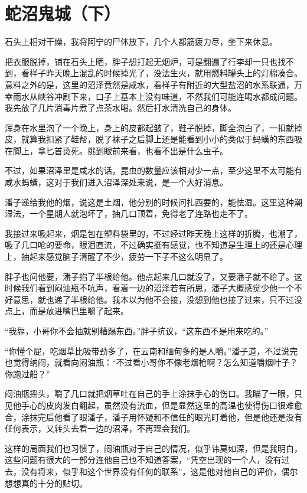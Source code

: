 \chapter{蛇沼鬼城（下）}

石头上相对干燥，我将阿宁的尸体放下，几个人都筋疲力尽，坐下来休息。

把衣服脱掉，铺在石头上晒，胖子想打起无烟炉，可是翻遍了行李却一只也找不到，看样子昨天晚上混乱的时候掉光了，没法生火，就用燃料罐头上的灯棉凑合。意料之外的是，这里的沼泽竟然是咸水，看样子有附近的大型盐沼的水系联通，万幸雨水从峡谷冲刷下来，口子上基本上没有味道，不然我们可能连喝水都成问题。我先放了几片消毒片煮了点茶水喝。然后打水清洗自己的身体。

浑身在水里泡了一个晚上，身上的皮都起皱了，鞋子脱掉，脚全泡白了，一扣就掉皮，就算我扣紧了鞋帮，脱了袜子之后脚上还是能看到小小的类似于蚂蟥的东西吸在脚上，拿匕首烫死。挑到眼前来看，也看不出是什么虫子。

不过，如果沼泽里是咸水的话，昆虫的数量应该相对少一点，至少这里不太可能有咸水蚂蟥，这对于我们进入沼泽深处来说，是一个大好消息。

潘子递给我他的烟，说这是土烟，他分别的时候问扎西要的，能怯湿。这里这种潮湿法，一个星期人就泡坏了，抽几口顶着，免得老了连路也走不了。

我接过来吸起来，烟是包在塑料袋里的，不过经过昨天晚上这样的折腾，也潮了，吸了几口呛的要命，眼泪直流，不过确实挺有感觉，也不知道是生理上的还是心理上，抽起来感觉脑子清醒了不少，疲劳一下子不这么明显了。

胖子也问他要，潘子掐了半根给他。他点起来几口就没了，又要潘子就不给了。这时候我们看到闷油瓶不吭声，看着一边的沼泽若有所思，潘子大概感觉少他一个不好意思，就也递了半根给他。我本以为他不会接，没想到他也接了过来，只不过没点上，而是放进嘴巴里嚼了起来。

“我靠，小哥你不会抽就别糟蹋东西。”胖子抗议，“这东西不是用来吃的。”

“你懂个屁，吃烟草比吸带劲多了，在云南和缅甸多的是人嚼。”潘子道，不过说完也觉得纳闷，就看向闷油瓶：“不过看小哥你不像老烟枪啊？怎么知道嚼烟叶子？你跑过船？”

闷油瓶摇头，嚼了几口就把烟草吐在自己的手上涂抹手心的伤口。我瞄了一眼，只见他手心的皮肉发白翻起，虽然没有流血，但是显然这里的高温也使得伤口很难愈合，涂抹完后他看了眼潘子，潘子用怀疑和不信任的眼光盯着他，但是他还是没有任何表示，又转头去看一边的沼泽，不再理会我们。

这样的局面我们也习惯了，闷油瓶对于自己的情况，似乎讳莫如深，但是我明白，这些问题有很大的一部分连他自己也不知道答案，“凭空出现的一个人，没有过去，没有将来，似乎和这个世界没有任何的联系”，这是他对他自己的评价，偶尔想想真的十分的贴切。

